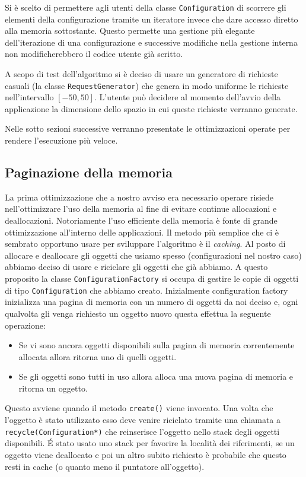 \documentclass[a4paper, 10pt]{article}
\begin{document}
Si è scelto di permettere agli utenti della 
classe \texttt{Configuration} di scorrere gli elementi della configurazione
tramite un iteratore invece che dare accesso diretto alla memoria sottostante.
Questo permette una gestione più elegante dell'iterazione di una configurazione
e successive modifiche nella gestione interna non modificherebbero il codice
utente già scritto. 

A scopo di test dell'algoritmo si è deciso di usare un generatore di richieste
casuali (la classe \texttt{RequestGenerator}) che genera in modo uniforme le 
richieste nell'intervallo $[-50, 50]$. L'utente può decidere al momento 
dell'avvio della applicazione la dimensione dello spazio in cui queste richieste
verranno generate. 

Nelle sotto sezioni successive verranno presentate le ottimizzazioni operate
per rendere l'esecuzione più veloce. 

\subsection{Paginazione della memoria}
La prima ottimizzazione che a nostro avviso era necessario operare risiede 
nell'ottimizzare l'uso della memoria al fine di evitare continue allocazioni e
deallocazioni. Notoriamente l'uso efficiente della memoria è fonte di grande
ottimizzazione all'interno delle applicazioni. Il metodo più semplice che 
ci è sembrato opportuno usare per sviluppare l'algoritmo è il \emph{caching}.
Al posto di allocare e deallocare gli oggetti che usiamo spesso (configurazioni
nel nostro caso) abbiamo deciso di usare e riciclare gli oggetti che già abbiamo.
A questo proposito la classe \texttt{ConfigurationFactory} si occupa di gestire
le copie di oggetti di tipo \texttt{Configuration} che abbiamo creato. 
Inizialmente configuration factory inizializza una pagina di memoria con 
un numero di oggetti da noi deciso e, ogni qualvolta gli venga richiesto un 
oggetto nuovo questa effettua la seguente operazione:
\begin{itemize}
  \item Se vi sono ancora oggetti disponibili sulla pagina di memoria correntemente
  allocata allora ritorna uno di quelli oggetti.
  \item Se gli oggetti sono tutti in uso allora alloca una nuova pagina di 
  memoria e ritorna un oggetto.
\end{itemize}
Questo avviene quando il metodo \texttt{create()} viene invocato. Una volta 
che l'oggetto è stato utilizzato esso deve venire riciclato tramite una 
chiamata a \texttt{recycle(Configuration*)} che reinserisce l'oggetto nello 
stack degli oggetti disponibili. \'E stato usato uno stack per favorire la 
località dei riferimenti, se un oggetto viene deallocato e poi un altro 
subito richiesto è probabile che questo resti in cache (o quanto meno il 
puntatore all'oggetto).
\end{document}
